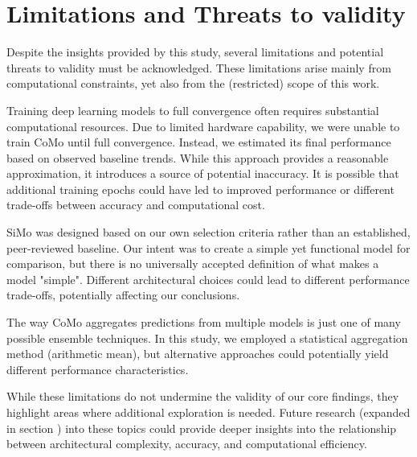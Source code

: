 \section{Limitations and Threats to validity} \label{sec:limitations}
Despite the insights provided by this study, several limitations and potential threats to validity must be acknowledged. These limitations arise mainly from computational constraints, yet also from the (restricted) scope of this work.

Training deep learning models to full convergence often requires substantial computational resources. Due to limited hardware capability, we were unable to train CoMo until full convergence. Instead, we estimated its final performance based on observed baseline trends. While this approach provides a reasonable approximation, it introduces a source of potential inaccuracy. It is possible that additional training epochs could have led to improved performance or different trade-offs between accuracy and computational cost.

SiMo was designed based on our own selection criteria rather than an established, peer-reviewed baseline. Our intent was to create a simple yet functional model for comparison, but there is no universally accepted definition of what makes a model "simple". Different architectural choices could lead to different performance trade-offs, potentially affecting our conclusions.

The way CoMo aggregates predictions from multiple models is just one of many possible ensemble techniques. In this study, we employed a statistical aggregation method (arithmetic mean), but alternative approaches could potentially yield different performance characteristics.

While these limitations do not undermine the validity of our core findings, they highlight areas where additional exploration is needed. Future research (expanded in section ) into these topics could provide deeper insights into the relationship between architectural complexity, accuracy, and computational efficiency.

